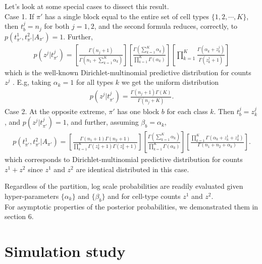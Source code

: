 \documentclass[11pt]{amsart}
\begin{document}
Let's look at some special cases to dissect this result. \\
Case 1. If $\pi'$ has a single block equal to the entire
 set of cell types $\{1,2, \cdots, K\}$,  then $t^j_b=n_j$ for both $j=1,2$,
and the second formula reduces, correctly, to 
$p(t^1_{\pi'},t^2_{\pi'}| A_{\pi'}) = 1$.  Further,
\begin{eqnarray*}
p(z^j|t^j_{\pi'}) = 
\left[ \frac{ \Gamma(n_j +1 ) }{ \Gamma( n_1 + \sum_{k=1}^K \alpha_k ) }
\right]
\left[ \frac{\Gamma( \sum_{k =1}^K \alpha_k )}{
                \prod_{k=1}^K \Gamma( \alpha_k ) } \right]
       \left[    \prod_{k=1}^K    \frac{  \Gamma(\alpha_k + z^j_k)}{
                \Gamma(z^j_k + 1 )}\right]
\end{eqnarray*}
which is the well-known Dirichlet-multinomial predictive distribution
for counts $z^j$ \cite{Wag}.  E.g, taking $\alpha_k=1$ for all types $k$ 
we get the uniform distribution
\begin{eqnarray*}
p(z^j|t^j_{\pi'}) = 
 \frac{ \Gamma(n_j +1 ) \Gamma(K) }{ \Gamma( n_j + K ) }.
\end{eqnarray*}
Case 2. At the opposite extreme, $\pi'$  has one block $b$ for each
 class $k$. Then $t^j_b = z^j_k$, and $p(z^j|t^j_{\pi'}) = 1$, and 
further, assuming $\beta_b = \alpha_k$,
\begin{eqnarray*}
p(t^1_{\pi'},t^2_{\pi'}| A_{\pi'}) =
 \left[ \frac{ \Gamma(n_1+1) \Gamma(n_2+1) }{ \prod_{k=1}^K 
   \Gamma(z^1_k+1) 
   \Gamma( z^2_k + 1 )} \right] 
\left[ \frac{\Gamma( \sum_{k=1}^K \alpha_k  )}{
   \prod_{k=1}^K \Gamma(\alpha_k )} \right] 
 \left[ \frac{ \prod_{k=1}^K \Gamma( \alpha_k + z^1_k + z^2_k )}{
	\Gamma( n_1 + n_2 + \alpha_k  )} \right].
\end{eqnarray*}
which corresponds to Dirichlet-multinomial predictive distribution for counts $z^1 + z^2$ 
since $z^1$ and $z^2$ are identical distributed in this case.

Regardless of the partition,
log scale probabilities are readily evaluated 
given hyper-parameters $\{ \alpha_k \}$ and $\{ \beta_b \}$ and for
cell-type counts $z^1$ and $z^2$. \\
For asymptotic properties of the posterior probabilities, we demonstrated them in section 6. 
 
\section{Simulation study} 
\end{document}
